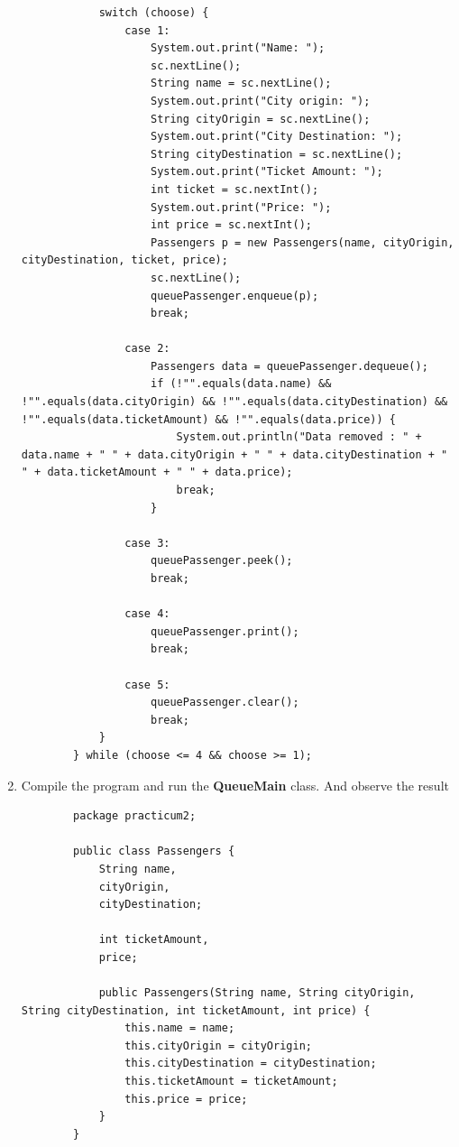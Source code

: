 \documentclass[12pt,titlepage]{article}
\begin{document}
\begin{enumerate}
\begin{verbatim}
            switch (choose) {
                case 1:
                    System.out.print("Name: ");
                    sc.nextLine();
                    String name = sc.nextLine();
                    System.out.print("City origin: ");
                    String cityOrigin = sc.nextLine();
                    System.out.print("City Destination: ");
                    String cityDestination = sc.nextLine();
                    System.out.print("Ticket Amount: ");
                    int ticket = sc.nextInt();
                    System.out.print("Price: ");
                    int price = sc.nextInt();
                    Passengers p = new Passengers(name, cityOrigin, cityDestination, ticket, price);
                    sc.nextLine();
                    queuePassenger.enqueue(p);
                    break;
            
                case 2:
                    Passengers data = queuePassenger.dequeue();
                    if (!"".equals(data.name) && !"".equals(data.cityOrigin) && !"".equals(data.cityDestination) && !"".equals(data.ticketAmount) && !"".equals(data.price)) {
                        System.out.println("Data removed : " + data.name + " " + data.cityOrigin + " " + data.cityDestination + " " + data.ticketAmount + " " + data.price);
                        break;
                    }
                
                case 3:
                    queuePassenger.peek();
                    break;
                
                case 4:
                    queuePassenger.print();
                    break;
                
                case 5:
                    queuePassenger.clear();
                    break;
            }
        } while (choose <= 4 && choose >= 1);
    \end{verbatim}
    \item Compile the program and run the \textbf{QueueMain} class. And observe the result
    \begin{verbatim}
        package practicum2;

        public class Passengers {
            String name,
            cityOrigin,
            cityDestination;
            
            int ticketAmount,
            price;

            public Passengers(String name, String cityOrigin, String cityDestination, int ticketAmount, int price) {
                this.name = name;
                this.cityOrigin = cityOrigin;
                this.cityDestination = cityDestination;
                this.ticketAmount = ticketAmount;
                this.price = price;
            }
        }
    \end{verbatim}


\end{enumerate}
\end{document}
